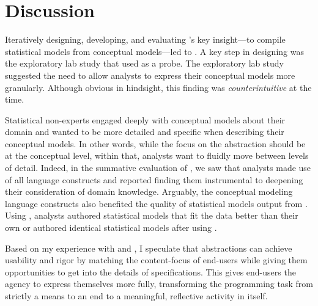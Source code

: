 \section{Discussion}
Iteratively designing, developing, and evaluating \tisane's key insight---to
compile statistical models from conceptual models---led to \rTisane. A key step
in designing \rTisane was the exploratory lab study that used \tisane as a
probe. The exploratory lab study suggested the need to allow analysts to express
their conceptual models more granularly. Although obvious in hindsight, this
finding was \textit{counterintuitive} at the time. 

Statistical non-experts engaged deeply with conceptual models
about their domain and wanted to be more detailed and specific when describing
their conceptual models. In other words, while the focus on the abstraction
should be at the conceptual level, within that, analysts want to fluidly move between levels of detail. Indeed, in the summative evaluation of \rTisane,
we saw that analysts made use of all language constructs and reported finding
them instrumental to deepening their consideration of domain knowledge.
Arguably, the conceptual modeling language constructs also benefited the quality
of statistical models output from \rTisane. Using \rTisane, analysts authored
statistical models that fit the data better than their own or authored identical
statistical models after using \rTisane.

Based on my experience with \tisane and \rTisane, I speculate that abstractions
can achieve usability and rigor by matching the content-focus of end-users while
giving them opportunities to get into the details of specifications.
This gives end-users the agency to express themselves more fully, transforming
the programming task from strictly a means to an end to a meaningful, reflective
activity in itself. 


